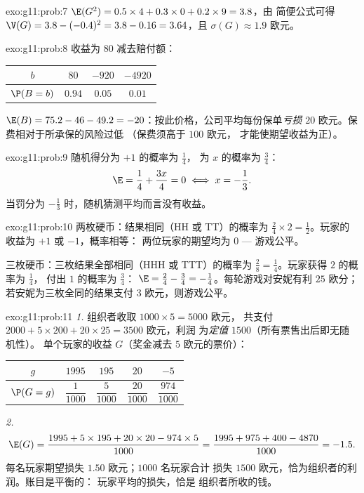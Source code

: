 \begin{solution}{exo:g11:prob:7}
$\E(G^2) = 0.5 \times 4 + 0.3 \times 0 + 0.2 \times 9 = 3.8$，由
简便公式可得
$\V(G) = 3.8 - (-0.4)^2 = 3.8 - 0.16 = 3.64$，且
$\sigma(G) \approx 1.9$ 欧元。
\end{solution}

\begin{solution}{exo:g11:prob:8}
收益为 $80$ 减去赔付额：
\begin{center}
\begin{tabular}{c|ccc}
$b$ & $80$ & $-920$ & $-4920$\\
\hline
$\P(B=b)$ & $0.94$ & $0.05$ & $0.01$
\end{tabular}
\end{center}
$\E(B) = 75.2 - 46 - 49.2 = -20$：按此价格，公司平均每份保单\emph{亏损}
$20$ 欧元。保费相对于所承保的风险过低
（保费须高于 $100$ 欧元，
才能使期望收益为正）。
\end{solution}

\begin{solution}{exo:g11:prob:9}
随机得分为 $+1$ 的概率为 $\frac14$，
为 $x$ 的概率为 $\frac34$：
\[
\E = \frac14 + \frac{3x}{4} = 0 \iff x = -\frac13 .
\]
当罚分为 $-\frac13$ 时，随机猜测平均而言没有收益。
\end{solution}

\begin{solution}{exo:g11:prob:10}
两枚硬币：结果相同（HH 或 TT）的概率为 $\frac24 \times 2 =
\frac12$。玩家的收益为 $+1$ 或 $-1$，概率相等：
两位玩家的期望均为 $0$ --- 游戏公平。

三枚硬币：三枚结果全部相同（HHH 或 TTT）的概率为 $\frac{2}{8} =
\frac14$。玩家获得 $2$ 的概率为 $\frac14$，
付出 $1$ 的概率为 $\frac34$：
$\E = \frac24 - \frac34 = -\frac14$。每轮游戏对安妮有利
$25$ 欧分；若安妮为三枚全同的结果支付 $3$ 欧元，则游戏公平。
\end{solution}

\begin{solution}{exo:g11:prob:11}
\emph{1.} 组织者收取 $1000 \times 5 = 5000$ 欧元，
共支付 $2000 + 5 \times 200 + 20 \times 25 = 3500$ 欧元，利润
为\emph{定值} $1500$（所有票售出后即无随机性）。
单个玩家的收益 $G$（奖金减去 $5$ 欧元的票价）：
\begin{center}
\begin{tabular}{c|cccc}
$g$ & $1995$ & $195$ & $20$ & $-5$\\
\hline\rule{0pt}{11pt}%
$\P(G=g)$ & $\dfrac{1}{1000}$ & $\dfrac{5}{1000}$ & $\dfrac{20}{1000}$
& $\dfrac{974}{1000}$
\end{tabular}
\end{center}

\emph{2.}
\[
\E(G) = \frac{1995 + 5 \times 195 + 20 \times 20 - 974 \times 5}{1000}
= \frac{1995 + 975 + 400 - 4870}{1000} = -1.5 .
\]
每名玩家期望损失 $1.50$ 欧元；$1000$ 名玩家合计
损失 $1500$ 欧元，恰为组织者的利润。账目是平衡的：
玩家平均的损失，恰是
组织者所收的钱。
\end{solution}

